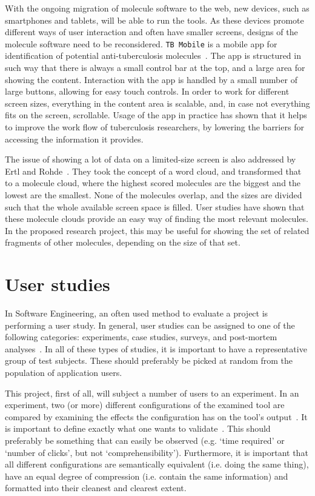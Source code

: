 With the ongoing migration of molecule software to the web, new devices, such as smartphones and tablets, will be able to run the tools. As these devices promote different ways of user interaction and often have smaller screens, designs of the molecule software need to be reconsidered. \verb|TB Mobile| is a mobile app for identification of potential anti-tuberculosis molecules~\cite{ekins2013tb}. The app is structured in such way that there is always a small control bar at the top, and a large area for showing the content. Interaction with the app is handled by a small number of large buttons, allowing for easy touch controls. In order to work for different screen sizes, everything in the content area is scalable, and, in case not everything fits on the screen, scrollable. Usage of the app in practice has shown that it helps to improve the work flow of tuberculosis researchers, by lowering the barriers for accessing the information it provides.

The issue of showing a lot of data on a limited-size screen is also addressed by Ertl and Rohde~\cite{ertl2012molecule}. They took the concept of a word cloud, and transformed that to a molecule cloud, where the highest scored molecules are the biggest and the lowest are the smallest. None of the molecules overlap, and the sizes are divided such that the whole available screen space is filled. User studies have shown that these molecule clouds provide an easy way of finding the most relevant molecules. In the proposed research project, this may be useful for showing the set of related fragments of other molecules, depending on the size of that set.


\section{User studies}

In Software Engineering, an often used method to evaluate a project is performing a user study. In general, user studies can be assigned to one of the following categories: experiments, case studies, surveys, and post-mortem analyses~\cite{wohlin2003empirical}. In all of these types of studies, it is important to have a representative group of test subjects. These should preferably be picked at random from the population of application users.

This project, first of all, will subject a number of users to an experiment. In an experiment, two (or more) different configurations of the examined tool are compared by examining the effects the configuration has on the tool's output~\cite{wohlin2003empirical}. It is important to define exactly what one wants to validate~\cite{stein2009assessing}. This should preferably be something that can easily be observed (e.g. `time required' or `number of clicks', but not `comprehensibility'). Furthermore, it is important that all different configurations are semantically equivalent (i.e. doing the same thing), have an equal degree of compression (i.e. contain the same information) and formatted into their cleanest and clearest extent.

